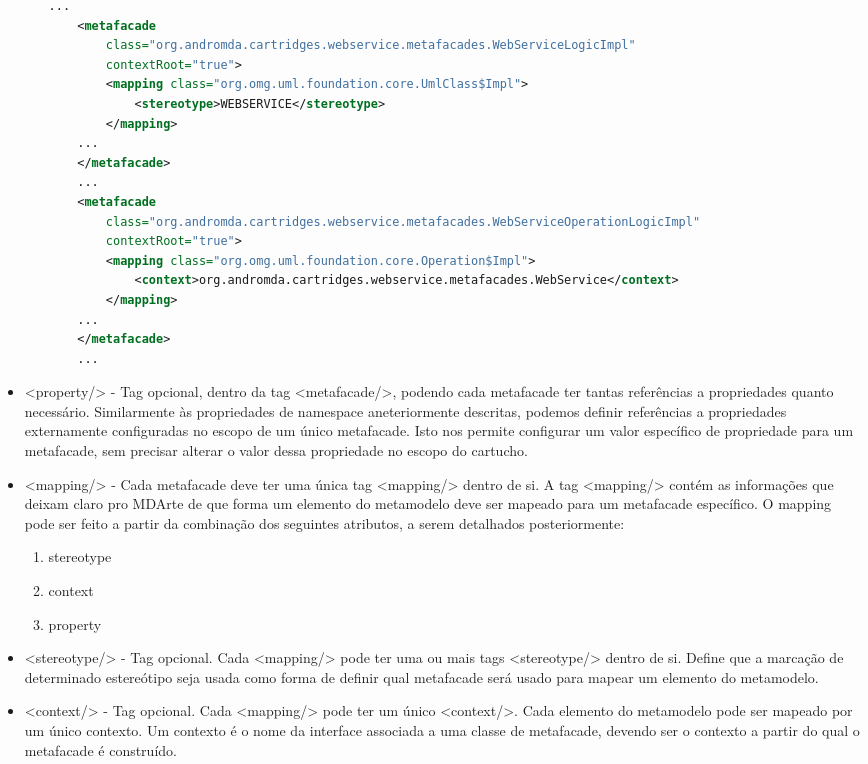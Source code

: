 \begin{itemize}
\begin{enumerate}
    \begin{lstlisting}[language=xml]
	...
	<metafacade
		class="org.andromda.cartridges.webservice.metafacades.WebServiceLogicImpl"
		contextRoot="true"> 
		<mapping class="org.omg.uml.foundation.core.UmlClass$Impl">
			<stereotype>WEBSERVICE</stereotype> 
		</mapping> 
	...
	</metafacade>
	...
	<metafacade
		class="org.andromda.cartridges.webservice.metafacades.WebServiceOperationLogicImpl"
		contextRoot="true">
		<mapping class="org.omg.uml.foundation.core.Operation$Impl">
			<context>org.andromda.cartridges.webservice.metafacades.WebService</context> 
		</mapping> 
	...
	</metafacade>
	...
	\end{lstlisting}
  \end{enumerate}
  
  \item <property/> - Tag opcional, dentro da tag <metafacade/>, podendo cada
  metafacade ter tantas referências a propriedades quanto necessário.
  Similarmente às propriedades de namespace aneteriormente descritas, podemos
  definir referências a propriedades externamente configuradas no escopo de um
  único metafacade. Isto nos permite configurar um valor específico de
  propriedade para um metafacade, sem precisar alterar o valor dessa propriedade
  no escopo do cartucho.
  \item <mapping/> - Cada metafacade deve ter uma única tag <mapping/>
  dentro de si. A tag <mapping/> contém as informações que deixam claro pro
  MDArte de que forma um elemento do metamodelo deve ser mapeado para um
  metafacade específico. O mapping pode ser feito a partir da combinação dos
  seguintes atributos, a serem detalhados posteriormente:

  \begin{enumerate}
    \item stereotype 
    \item context
    \item property
  \end{enumerate}
  
  \item <stereotype/> - Tag opcional. Cada <mapping/> pode ter uma ou mais tags
  <stereotype/> dentro de si. Define que a marcação de determinado estereótipo
  seja usada como forma de definir qual metafacade será usado para mapear um
  elemento do metamodelo.
  
  \item <context/> - Tag opcional. Cada <mapping/> pode ter um único
  <context/>. Cada elemento do metamodelo pode ser mapeado por um único
  contexto. Um contexto é o nome da interface associada a uma classe de
  metafacade, devendo ser o contexto a partir do qual o metafacade é
  construído.
  

\end{itemize}
